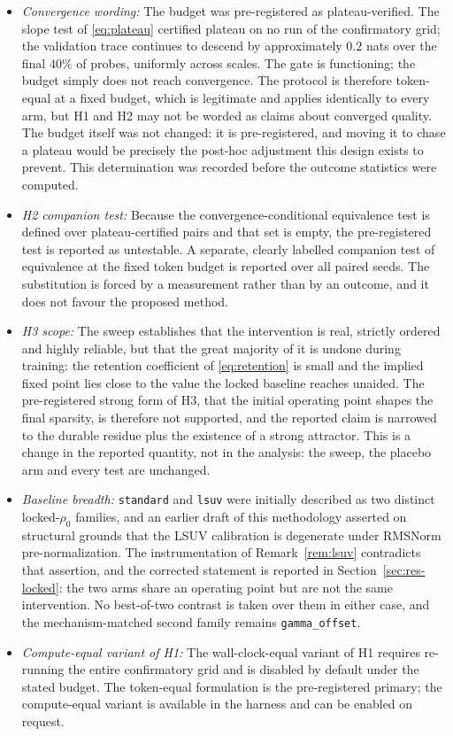 \documentclass[final,5p,times,twocolumn]{elsarticle}
\theoremstyle{remark}
\newcommand{\rhoz}{\rho_{0}}
\begin{document}
\begin{itemize}
\item[] \textit{Convergence wording:} The budget was pre-registered as
plateau-verified. The slope test of \eqref{eq:plateau} certified plateau on no
run of the confirmatory grid; the validation trace continues to descend by
approximately $0.2$ nats over the final $40\%$ of probes, uniformly across
scales. The gate is functioning; the budget simply does not reach convergence.
The protocol is therefore token-equal at a fixed budget, which is legitimate
and applies identically to every arm, but H1 and H2 may not be worded as claims
about converged quality. The budget itself was not changed: it is
pre-registered, and moving it to chase a plateau would be precisely the post-hoc
adjustment this design exists to prevent. This determination was recorded before
the outcome statistics were computed.

\item[] \textit{H2 companion test:} Because the convergence-conditional
equivalence test is defined over plateau-certified pairs and that set is empty,
the pre-registered test is reported as untestable. A separate, clearly labelled
companion test of equivalence at the fixed token budget is reported over all
paired seeds. The substitution is forced by a measurement rather than by an
outcome, and it does not favour the proposed method.

\item[] \textit{H3 scope:} The sweep establishes that the intervention is real,
strictly ordered and highly reliable, but that the great majority of it is
undone during training: the retention coefficient of \eqref{eq:retention} is
small and the implied fixed point lies close to the value the locked baseline
reaches unaided. The pre-registered strong form of H3, that the initial
operating point shapes the final sparsity, is therefore not supported,
and the reported claim is narrowed to the durable residue plus the existence of
a strong attractor. This is a change in the reported quantity, not in the
analysis: the sweep, the placebo arm and every test are unchanged.

\item[] \textit{Baseline breadth:} \texttt{standard} and \texttt{lsuv} were
initially described as two distinct locked-$\rhoz$ families, and an earlier
draft of this methodology asserted on structural grounds that the LSUV
calibration is degenerate under RMSNorm pre-normalization. The instrumentation
of Remark~\ref{rem:lsuv} contradicts that assertion, and the corrected
statement is reported in Section~\ref{sec:res-locked}: the two arms share an
operating point but are not the same intervention. No best-of-two contrast is
taken over them in either case, and the mechanism-matched second family
remains \texttt{gamma\_offset}.

\item[] \textit{Compute-equal variant of H1:} The wall-clock-equal variant of H1
requires re-running the entire confirmatory grid and is disabled by default
under the stated budget. The token-equal formulation is the pre-registered
primary; the compute-equal variant is available in the harness and can be
enabled on request.
\end{itemize}
\end{document}
